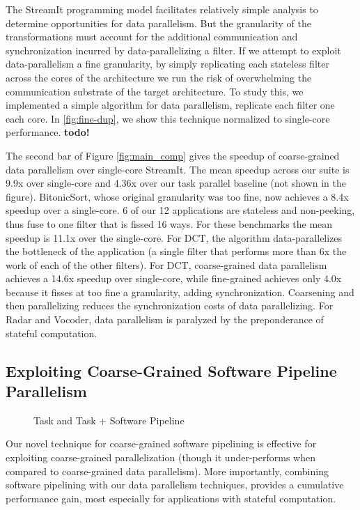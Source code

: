 The StreamIt programming model facilitates relatively simple analysis
to determine opportunities for data parallelism.  But the granularity
of the transformations must account for the additional communication and
synchronization incurred by data-parallelizing a filter.  If we
attempt to exploit data-parallelism a fine granularity, by simply
replicating each stateless filter across the cores of the architecture
we run the risk of overwhelming the communication substrate of the
target architecture.  To study this, we implemented a simple algorithm
for data parallelism,  replicate each filter one each core.  
In \ref{fig:fine-dup}, we show this technique normalized to
single-core performance.  \textbf{todo!}

The second bar of Figure \ref{fig:main_comp} gives the speedup of
coarse-grained data parallelism over single-core StreamIt. The mean
speedup across our suite is 9.9x over single-core and 4.36x over our
task parallel baseline (not shown in the figure).  BitonicSort, whose
original granularity was too fine, now achieves a 8.4x speedup over a
single-core. 6 of our 12 applications are stateless and non-peeking,
thus fuse to one filter that is fissed 16 ways.  For these benchmarks
the mean speedup is 11.1x over the single-core.  For DCT, the
algorithm data-parallelizes the bottleneck of the application (a
single filter that performs more than 6x the work of each of the other
filters).  For DCT, coarse-grained data parallelism achieves a 14.6x
speedup over single-core, while fine-grained achieves only 4.0x
because it fisses at too fine a granularity, adding synchronization.
Coarsening and then parallelizing reduces the synchronization costs of
data parallelizing.  For Radar and Vocoder, data parallelism is paralyzed by
the preponderance of stateful computation.

\subsection{Exploiting Coarse-Grained Software Pipeline Parallelism}

\begin{figure}[t]
\centering
{}
\caption{Task and Task + Software Pipeline
\protect\label{fig:softpipe_graph}}
\end{figure}
Our novel technique for coarse-grained software pipelining is
effective for exploiting coarse-grained parallelization (though it
under-performs when compared to coarse-grained data parallelism).
More importantly, combining software pipelining with our data
parallelism techniques, provides a cumulative performance gain,
most especially for applications with stateful computation.

